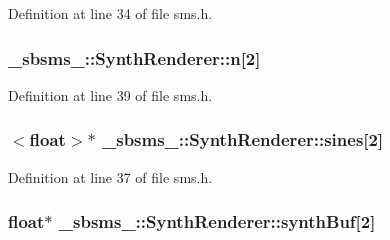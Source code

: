 Definition at line 34 of file sms.\+h.

\subsubsection[{\texorpdfstring{n}{n}}]{ \+\_\+sbsms\+\_\+\+::\+Synth\+Renderer\+::n\mbox{[}2\mbox{]}\hspace{0.3cm}{\ttfamily [protected]}}\hypertarget{class__sbsms___1_1_synth_renderer_a7626296570a5cad66d406a74b7d86cb2}{}\label{class__sbsms___1_1_synth_renderer_a7626296570a5cad66d406a74b7d86cb2}


Definition at line 39 of file sms.\+h.

\subsubsection[{\texorpdfstring{sines}{sines}}]{$<$float$>$$\ast$ \+\_\+sbsms\+\_\+\+::\+Synth\+Renderer\+::sines\mbox{[}2\mbox{]}\hspace{0.3cm}{\ttfamily [protected]}}\hypertarget{class__sbsms___1_1_synth_renderer_ac560520197d381b039c8cbbc5c5e9fab}{}\label{class__sbsms___1_1_synth_renderer_ac560520197d381b039c8cbbc5c5e9fab}


Definition at line 37 of file sms.\+h.

\subsubsection[{\texorpdfstring{synth\+Buf}{synthBuf}}]{\setlength{\rightskip}{0pt plus 5cm}float$\ast$ \+\_\+sbsms\+\_\+\+::\+Synth\+Renderer\+::synth\+Buf\mbox{[}2\mbox{]}\hspace{0.3cm}{\ttfamily [protected]}}\hypertarget{class__sbsms___1_1_synth_renderer_a00c6935b2c584684860657a40e801789}{}\label{class__sbsms___1_1_synth_renderer_a00c6935b2c584684860657a40e801789}


